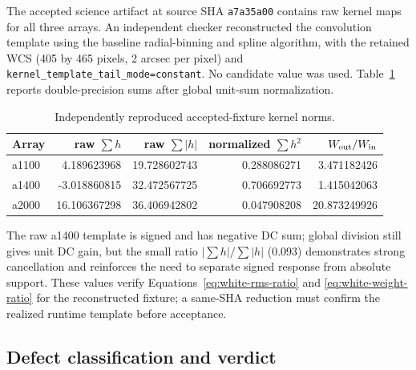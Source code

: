 \documentclass[11pt]{article}
\newcommand{\code}[1]{\nolinkurl{#1}}
\begin{document}
The accepted science artifact at source SHA \code{a7a35a00} contains raw
kernel maps for all three arrays.  An independent checker reconstructed the
convolution template using the baseline radial-binning and spline algorithm,
with the retained WCS (405 by 465 pixels, 2 arcsec per pixel) and
\code{kernel_template_tail_mode=constant}.  No candidate value was used.
Table~\ref{tab:kernel-squares} reports double-precision sums after global
unit-sum normalization.

\begin{table}[htbp]
\centering
\caption{Independently reproduced accepted-fixture kernel norms.}
\label{tab:kernel-squares}
\begin{tabular}{lrrrr}
\toprule
Array & raw $\sum h$ & raw $\sum|h|$ & normalized $\sum h^2$
      & $W_{\rm out}/W_{\rm in}$\\
\midrule
a1100 & 4.189623968 & 19.728602743 & 0.288086271 & 3.471182426\\
a1400 & -3.018860815 & 32.472567725 & 0.706692773 & 1.415042063\\
a2000 & 16.106367298 & 36.406942802 & 0.047908208 & 20.873249926\\
\bottomrule
\end{tabular}
\end{table}
The raw a1400 template is signed and has negative DC sum; global division
still gives unit DC gain, but the small ratio $|\sum h|/\sum|h|$ (0.093)
demonstrates strong cancellation and reinforces the need to separate signed
response from absolute support.  These values verify
Equations~\eqref{eq:white-rms-ratio} and \eqref{eq:white-weight-ratio} for the
reconstructed fixture; a same-SHA reduction must confirm the realized runtime
template before acceptance.

\subsection{Defect classification and verdict}
\end{document}
